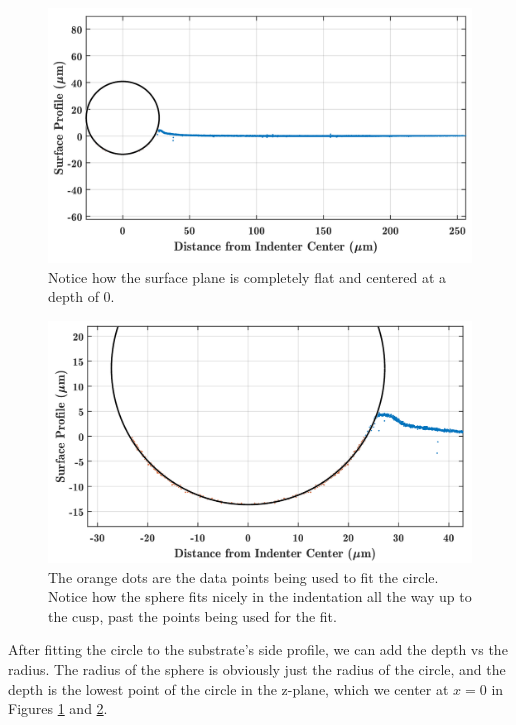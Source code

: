 \begin{figure}[h!]
	\centering
	\includegraphics[width=\linewidth]{Chapters/Figures/sphere011_ia/circle_fit}
	\caption[Circle Fit]{Notice how the surface plane is completely flat and centered at a depth of 0.}
	\label{fig:circlefit}
\end{figure}
\begin{figure}[h!]
	\centering
	\includegraphics[width=\linewidth]{Chapters/Figures/sphere011_ia/circle_fit_zoomed}
	\caption[Circle Fit Zoomed]{The orange dots are the data points being used to fit the circle. Notice how the sphere fits nicely in the indentation all the way up to the cusp, past the points being used for the fit.}
	\label{fig:circlefitzoomed}
\end{figure}

After fitting the circle to the substrate's side profile, we can add the depth vs the radius. The radius of the sphere is obviously just the radius of the circle, and the depth is the lowest point of the circle in the z-plane, which we center at $ x=0 $ in Figures \ref{fig:circlefit} and \ref{fig:circlefitzoomed}.  

